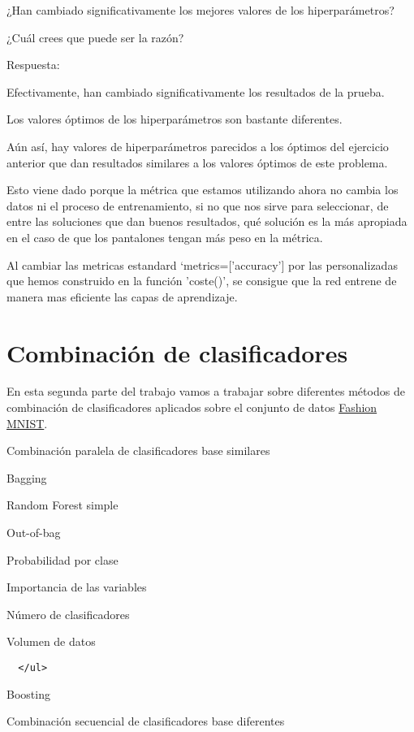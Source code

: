 \documentclass[11pt]{article}
\begin{document}
¿Han cambiado significativamente los mejores valores de los
hiperparámetros?

¿Cuál crees que puede ser la razón?

    Respuesta:

Efectivamente, han cambiado significativamente los resultados de la
prueba.

Los valores óptimos de los hiperparámetros son bastante diferentes.

Aún así, hay valores de hiperparámetros parecidos a los óptimos del
ejercicio anterior que dan resultados similares a los valores óptimos de
este problema.

Esto viene dado porque la métrica que estamos utilizando ahora no cambia
los datos ni el proceso de entrenamiento, si no que nos sirve para
seleccionar, de entre las soluciones que dan buenos resultados, qué
solución es la más apropiada en el caso de que los pantalones tengan más
peso en la métrica.

Al cambiar las metricas estandard `metrics={[}'accuracy'{]} por las
personalizadas que hemos construido en la función 'coste()', se consigue
que la red entrene de manera mas eficiente las capas de aprendizaje.

    \hypertarget{combinaciuxf3n-de-clasificadores}{%
\section{Combinación de
clasificadores}\label{combinaciuxf3n-de-clasificadores}}

En esta segunda parte del trabajo vamos a trabajar sobre diferentes
métodos de combinación de clasificadores aplicados sobre el conjunto de
datos \href{https://github.com/zalandoresearch/fashion-mnist}{Fashion
MNIST}.

Combinación paralela de clasificadores base similares

Bagging

Random Forest simple

Out-of-bag

Probabilidad por clase

Importancia de las variables

Número de clasificadores

Volumen de datos

\begin{verbatim}
  </ul>
\end{verbatim}

Boosting

Combinación secuencial de clasificadores base diferentes
\end{document}
